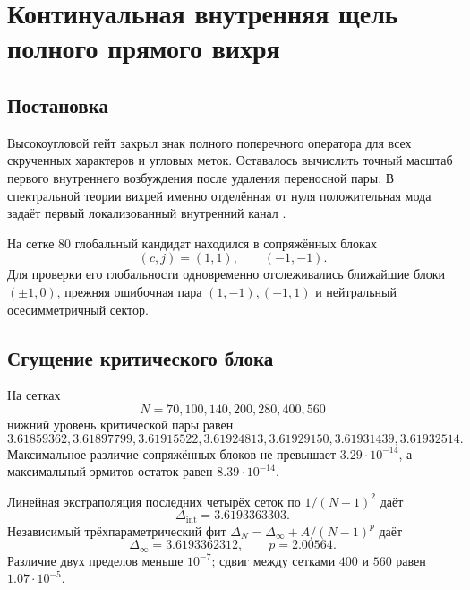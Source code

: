 \chapter{Континуальная внутренняя щель полного прямого вихря}
\label{ch:v6-bosonic-defect-full-tensor-internal-gap-gate}

\section{Постановка}

Высокоугловой гейт закрыл знак полного поперечного оператора для всех
скрученных характеров и угловых меток. Оставалось вычислить точный масштаб
первого внутреннего возбуждения после удаления переносной пары. В
спектральной теории вихрей именно отделённая от нуля положительная мода
задаёт первый локализованный внутренний канал
\cite{full-tensor-gap-alonso}.

На сетке $80$ глобальный кандидат находился в сопряжённых блоках
\begin{equation}
 (c,j)=(1,1),\qquad (-1,-1).
\end{equation}
Для проверки его глобальности одновременно отслеживались ближайшие блоки
$(\pm1,0)$, прежняя ошибочная пара $(1,-1),(-1,1)$ и нейтральный
осесимметричный сектор.

\section{Сгущение критического блока}

На сетках
\begin{equation}
 N=70,100,140,200,280,400,560
\end{equation}
нижний уровень критической пары равен
\begin{equation}
 3.61859362,
 3.61897799,
 3.61915522,
 3.61924813,
 3.61929150,
 3.61931439,
 3.61932514.
\end{equation}
Максимальное различие сопряжённых блоков не превышает
$3.29\cdot10^{-14}$, а максимальный эрмитов остаток равен
$8.39\cdot10^{-14}$.

Линейная экстраполяция последних четырёх сеток по $1/(N-1)^2$ даёт
\begin{equation}
 \Delta_{\mathrm{int}}=3.6193363303.
\end{equation}
Независимый трёхпараметрический фит
$\Delta_N=\Delta_\infty+A/(N-1)^p$ даёт
\begin{equation}
 \Delta_\infty=3.6193362312,
 \qquad p=2.00564.
\end{equation}
Различие двух пределов меньше $10^{-7}$; сдвиг между сетками $400$ и $560$
равен $1.07\cdot10^{-5}$.

